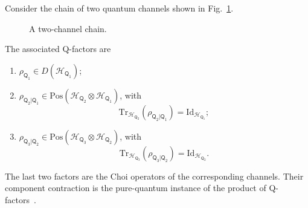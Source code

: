 \documentclass[
    aps,
    pra,
    reprint,
    superscriptaddress,
    nofootinbib
]{revtex4-2}
\theoremstyle{definition}
\theoremstyle{plain}
\begin{document}
Consider the chain of two quantum channels shown in
Fig.~\ref{fig:qbn1}.
\par
\begin{figure}[ht]
    \centering
    \caption{A two-channel chain.}
    \label{fig:qbn1}
\end{figure}
\par
The associated Q-factors are
\begin{enumerate}
    \item
    $\rho_{\mathsf{Q}_{1}}
    \in D(\mathcal{H}_{\mathsf{Q}_{1}})$;

    \item
    $\rho_{\mathsf{Q}_{2}|\mathsf{Q}_{1}}
    \in
    \mathrm{Pos}(
        \mathcal{H}_{\mathsf{Q}_{2}}
        \otimes
        \mathcal{H}_{\mathsf{Q}_{1}}
    )$, with
    \begin{equation}
        \mathrm{Tr}_{\mathcal{H}_{\mathsf{Q}_{2}}}
        \left(
            \rho_{\mathsf{Q}_{2}|\mathsf{Q}_{1}}
        \right)
        =
        \mathrm{Id}_{\mathcal{H}_{\mathsf{Q}_{1}}};
    \end{equation}

    \item
    $\rho_{\mathsf{Q}_{3}|\mathsf{Q}_{2}}
    \in
    \mathrm{Pos}(
        \mathcal{H}_{\mathsf{Q}_{3}}
        \otimes
        \mathcal{H}_{\mathsf{Q}_{2}}
    )$, with
    \begin{equation}
        \mathrm{Tr}_{\mathcal{H}_{\mathsf{Q}_{3}}}
        \left(
            \rho_{\mathsf{Q}_{3}|\mathsf{Q}_{2}}
        \right)
        =
        \mathrm{Id}_{\mathcal{H}_{\mathsf{Q}_{2}}}.
    \end{equation}
\end{enumerate}
The last two factors are the Choi operators of the corresponding
channels. Their component contraction is the pure-quantum instance of
the product of Q-factors~\cite[Def.~17]{DiGuardiaEhrhardFaggian2026}.
\end{document}
